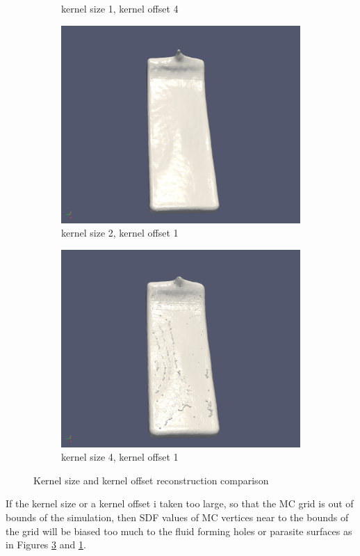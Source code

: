 \begin{figure}
\begin{subfigure}[b]{0.5\textwidth}
               \caption{kernel size 1, kernel offset 4}
               \label{fig:ks1ko4}
        \end{subfigure}
        \begin{subfigure}[b]{0.5\textwidth}
               \includegraphics[width=\textwidth]{figures/DBBlur_ks-2_ko-1.png}
               \caption{kernel size 2, kernel offset 1}
               \label{fig:ks2ko1}
        \end{subfigure}        
        \begin{subfigure}[b]{0.5\textwidth}
               \includegraphics[width=\textwidth]{figures/DBBlur_ks-4_ko-1.png}
               \caption{kernel size 4, kernel offset 1}
               \label{fig:ks4ko1}
        \end{subfigure}
        \caption{Kernel size and kernel offset reconstruction comparison}
        \label{fig:ksko}
\end{figure}
If the kernel size or a kernel offset i taken too large, so that the MC grid is out of bounds of the simulation, then SDF values of MC vertices near to the bounds of the grid will be biased too much to the fluid forming holes or parasite surfaces as in Figures \ref{fig:ks4ko1} and \ref{fig:ks1ko4}.
